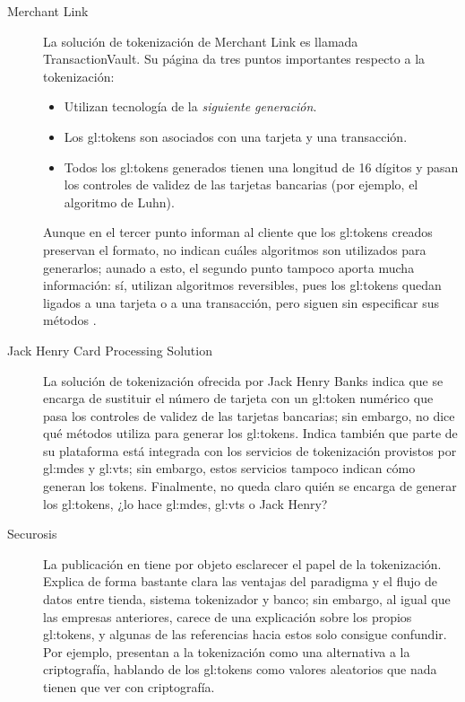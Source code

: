 \begin{description}
  \item[Merchant Link]
    La solución de tokenización de Merchant Link es llamada TransactionVault. Su
    página da tres puntos importantes respecto a la tokenización:
    \begin{itemize}
      \item Utilizan tecnología de la \textit{siguiente generación}.
      \item Los \glspl{gl:token} son asociados con una tarjeta y una
        transacción.
      \item Todos los \glspl{gl:token} generados tienen una longitud de 16
        dígitos y pasan los controles de validez de las tarjetas bancarias
        (por ejemplo, el algoritmo de Luhn\footnotemark).
    \end{itemize}

      Aunque en el tercer punto informan al cliente que los \glspl{gl:token}
      creados preservan el formato, no indican cuáles algoritmos son utilizados
      para generarlos; aunado a esto, el segundo punto tampoco aporta mucha
      información: sí, utilizan algoritmos reversibles\footnotemark, pues los
      \glspl{gl:token} quedan ligados a una tarjeta o a una transacción,
      pero siguen sin especificar sus métodos \cite{merchant_link}.


    \item[Jack Henry Card Processing Solution]
      La solución de tokenización ofrecida por Jack Henry Banks indica que se
      encarga de sustituir el número de tarjeta con un \gls{gl:token} numérico
      que pasa los controles de validez  de las tarjetas bancarias; sin
      embargo, no dice qué métodos utiliza para generar los \glspl{gl:token}.
      Indica también que parte de su plataforma está integrada con los servicios
      de tokenización provistos por \gls{gl:mdes} y \gls{gl:vts}; sin embargo,
      estos servicios tampoco indican cómo generan los tokens. Finalmente, no
      queda claro quién se encarga de generar los \glspl{gl:token}, ¿lo hace
      \gls{gl:mdes}, \gls{gl:vts} o Jack Henry?\cite{jack_henry, mdes_1, mdes_2}

    \item[Securosis]
      La publicación en \cite{securosis} tiene por objeto esclarecer el papel
      de la tokenización. Explica de forma bastante clara las ventajas del
      paradigma y el flujo de datos entre tienda, sistema tokenizador y banco;
      sin embargo, al igual que las empresas anteriores, carece de una
      explicación sobre los propios \glspl{gl:token}, y algunas de las
      referencias hacia estos solo consigue confundir. Por ejemplo, presentan
      a la tokenización como una alternativa a la criptografía, hablando
      de los \glspl{gl:token} como valores aleatorios que nada tienen que
      ver con criptografía.


\end{description}
